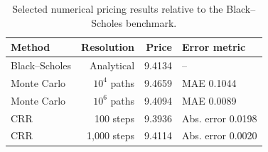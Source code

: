 \begin{table}[H]
\centering
\caption{Selected numerical pricing results relative to the Black--Scholes benchmark.}
\label{tab:pricing}
\begin{tabular}{lrrl}
\toprule
Method & Resolution & Price & Error metric \\
\midrule
Black--Scholes & Analytical & 9.4134 & -- \\
Monte Carlo & $10^4$ paths & 9.4659 & MAE 0.1044 \\
Monte Carlo & $10^6$ paths & 9.4094 & MAE 0.0089 \\
CRR & 100 steps & 9.3936 & Abs. error 0.0198 \\
CRR & 1,000 steps & 9.4114 & Abs. error 0.0020 \\
\bottomrule
\end{tabular}
\end{table}
